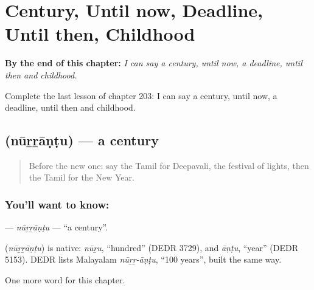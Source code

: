 
\chapter{Century, Until now, Deadline, Until then, Childhood}
\label{ch:ta-century-until-now-deadline-until-then-childhood}

\begin{chapteropening}
\textbf{By the end of this chapter:} \emph{I can say a century, until now, a deadline, until then and childhood.}

Complete the last lesson of chapter 203: I can say a century, until now, a deadline, until then and childhood.
\end{chapteropening}

\section[\texorpdfstring{\ta{நூற்றாண்டு} (nūṟṟāṇṭu)}{நூற்றாண்டு (nūṟṟāṇṭu)}]{ (nūṟṟāṇṭu) — a century}

\label{lesson:TA-C203-nurrantu}



\begin{quote}
Before the new one: say the Tamil for Deepavali, the festival of lights, then the Tamil for the New Year.
\end{quote}

\subsection*{You'll want to know: }
\textbf{} — \emph{nūṟṟāṇṭu} — \textquotedblleft{}a century\textquotedblright{}.

\begin{cousinweb}
\textbf{} (\emph{nūṟṟāṇṭu}) is native: \emph{nūṟu}, \textquotedblleft{}hundred\textquotedblright{} (DEDR 3729), and \emph{āṇṭu}, \textquotedblleft{}year\textquotedblright{} (DEDR 5153). DEDR lists Malayalam \emph{nūṟṟ-āṇṭu}, \textquotedblleft{}100 years\textquotedblright{}, built the same way.
\end{cousinweb}

\begin{grammarlens}[title={What you've built}]
One more word for this chapter.
\end{grammarlens}

